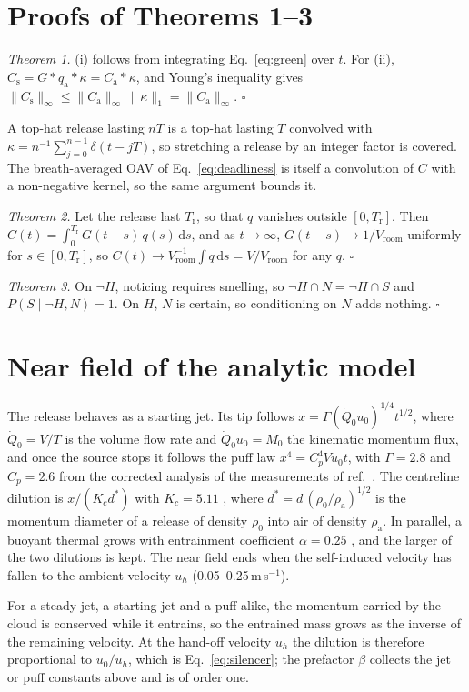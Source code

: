 \section{Proofs of Theorems 1--3}
\label{sec:app-proofs}

\emph{Theorem 1.} (i) follows from integrating Eq.~\eqref{eq:green} over $t$. For (ii),
$C_\mathrm{s} = G*q_\mathrm{a}*\kappa = C_\mathrm{a}*\kappa$, and Young's inequality gives
$\|C_\mathrm{s}\|_\infty \le \|C_\mathrm{a}\|_\infty\,\|\kappa\|_1 = \|C_\mathrm{a}\|_\infty$. \hfill$\square$

A top-hat release lasting $nT$ is a top-hat lasting $T$ convolved with
$\kappa = n^{-1}\sum_{j=0}^{n-1}\delta(t-jT)$, so stretching a release by an integer factor is covered. The
breath-averaged OAV of Eq.~\eqref{eq:deadliness} is itself a convolution of $C$ with a non-negative kernel, so the
same argument bounds it.

\emph{Theorem 2.} Let the release last $T_\mathrm{r}$, so that $q$ vanishes outside $[0, T_\mathrm{r}]$. Then
$C(t) = \int_0^{T_\mathrm{r}} G(t-s)\,q(s)\,\mathrm{d}s$, and as $t\to\infty$, $G(t-s)\to 1/V_\mathrm{room}$ uniformly
for $s\in[0,T_\mathrm{r}]$, so $C(t)\to V_\mathrm{room}^{-1}\int q\,\mathrm{d}s = V/V_\mathrm{room}$ for any $q$.
\hfill$\square$

\emph{Theorem 3.} On $\lnot H$, noticing requires smelling, so $\lnot H\cap N = \lnot H \cap S$ and
$P(S\mid\lnot H, N) = 1$. On $H$, $N$ is certain, so conditioning on $N$ adds nothing. \hfill$\square$

\section{Near field of the analytic model}
\label{sec:app-nearfield}
The release behaves as a starting jet. Its tip follows $x = \Gamma (\dot Q_0 u_0)^{1/4} t^{1/2}$, where
$\dot Q_0 = V/T$ is the volume flow rate and $\dot Q_0 u_0 = M_0$ the kinematic momentum flux, and once the source
stops it follows the puff law $x^4 = C_p^4 V u_0 t$, with $\Gamma = 2.8$ and $C_p = 2.6$ from the corrected analysis \cite{diez2003} of the
measurements of ref.~.
The centreline dilution is $x/(K_c d^*)$ with $K_c = 5.11$ \cite{dowling1990}, where
$d^* = d\,(\rho_0/\rho_\mathrm{a})^{1/2}$ is the momentum diameter of a release of density $\rho_0$ into air of
density $\rho_\mathrm{a}$. In parallel, a buoyant thermal
grows with entrainment coefficient $\alpha = 0.25$ \cite{landeau2014}, and the larger of the two dilutions is kept.
The near field ends when the self-induced velocity has fallen to the ambient velocity $u_h$
(0.05--0.25\,m\,s$^{-1}$).

For a steady jet, a starting jet and a puff alike, the momentum carried by the cloud is conserved while it entrains,
so the entrained mass grows as the inverse of the remaining velocity. At the hand-off velocity $u_h$ the dilution is
therefore proportional to $u_0/u_h$, which is Eq.~\eqref{eq:silencer}; the prefactor $\beta$ collects the jet or puff
constants above and is of order one.
